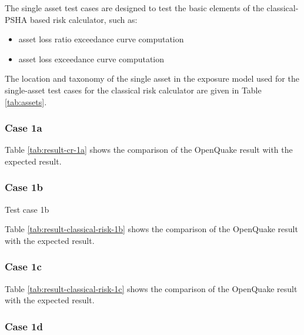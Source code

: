 The single asset test cases are designed to test the basic elements of the classical-PSHA based risk calculator, such as:

\begin{itemize}
\item asset loss ratio exceedance curve computation
\item asset loss exceedance curve computation
\end{itemize}

The location and taxonomy of the single asset in the exposure model used for the single-asset test cases for the classical risk calculator are given in Table \ref{tab:assets}.

\subsubsection{Case 1a}


Table \ref{tab:result-cr-1a} shows the comparison of the OpenQuake result with the expected result.

\subsubsection{Case 1b}
Test case 1b 



Table \ref{tab:result-classical-risk-1b} shows the comparison of the OpenQuake result with the expected result.

\subsubsection{Case 1c}




Table \ref{tab:result-classical-risk-1c} shows the comparison of the OpenQuake result with the expected result.

\subsubsection{Case 1d}


